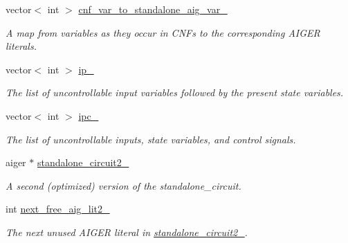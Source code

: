 \begin{DoxyCompactItemize}
vector$<$ int $>$ \hyperlink{classParExtractorWorker_a90ef43d28785c5c5607159ddc7b54ce3}{cnf\-\_\-var\-\_\-to\-\_\-standalone\-\_\-aig\-\_\-var\-\_\-}
\begin{DoxyCompactList}\small\item\em A map from variables as they occur in C\-N\-Fs to the corresponding A\-I\-G\-E\-R literals. \end{DoxyCompactList}\item 
vector$<$ int $>$ \hyperlink{classParExtractorWorker_ab1385a3c5d2f203f6a1dbaf1ed6b5fcd}{ip\-\_\-}
\begin{DoxyCompactList}\small\item\em The list of uncontrollable input variables followed by the present state variables. \end{DoxyCompactList}\item 
vector$<$ int $>$ \hyperlink{classParExtractorWorker_ae9deb9eac6b36f87f299d1eca77351d5}{ipc\-\_\-}
\begin{DoxyCompactList}\small\item\em The list of uncontrollable inputs, state variables, and control signals. \end{DoxyCompactList}\item 
aiger $\ast$ \hyperlink{classParExtractorWorker_a304c66039a45652e273876f7c6da8bcf}{standalone\-\_\-circuit2\-\_\-}
\begin{DoxyCompactList}\small\item\em A second (optimized) version of the standalone\-\_\-circuit. \end{DoxyCompactList}\item 
int \hyperlink{classParExtractorWorker_a334b3096ea7cdb2b3305ac3960aa065a}{next\-\_\-free\-\_\-aig\-\_\-lit2\-\_\-}
\begin{DoxyCompactList}\small\item\em The next unused A\-I\-G\-E\-R literal in \hyperlink{classParExtractorWorker_a304c66039a45652e273876f7c6da8bcf}{standalone\-\_\-circuit2\-\_\-}. \end{DoxyCompactList}\end{DoxyCompactItemize}
